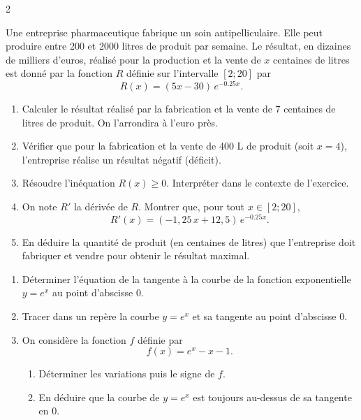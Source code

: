 \documentclass[a4paper,12pt]{article}
\begin{document}
\begin{multicols}{2}
    \newpage
    \begin{exercice}[title=Exercice 12 $\star\star$ { [Modéliser, Calculer] }]{}{}
      Une entreprise pharmaceutique fabrique un soin antipelliculaire. Elle peut produire entre 200 et 2000 litres de produit par semaine. Le résultat, en dizaines de milliers d’euros, réalisé pour la production et la vente de \(x\) centaines de litres est donné par la fonction \(R\) définie sur l’intervalle \([2;20]\) par  
      \[
      R(x)=(5x-30)\,e^{-0.25x}.
      \]
      \begin{enumerate}
        \item Calculer le résultat réalisé par la fabrication et la vente de 7 centaines de litres de produit. On l’arrondira à l’euro près.
        \item Vérifier que pour la fabrication et la vente de 400 L de produit (soit \(x=4\)), l’entreprise réalise un résultat négatif (déficit).
        \item Résoudre l’inéquation \(R(x)\ge0\). Interpréter dans le contexte de l’exercice.
        \item On note \(R'\) la dérivée de \(R\). Montrer que, pour tout \(x\in[2;20]\),
        \[
          R'(x)=(-1,25\,x+12,5)\,e^{-0.25x}.
        \]
        \item En déduire la quantité de produit (en centaines de litres) que l’entreprise doit fabriquer et vendre pour obtenir le résultat maximal.
      \end{enumerate}
      \end{exercice}
      
      \newcolumn
      
      \begin{exercice}[title=Exercice 13 $\star\star$ { [Raisonner, Représenter, Calculer] }]{}{}
      \begin{enumerate}
        \item[(a)] Déterminer l’équation de la tangente à la courbe de la fonction exponentielle \(y=e^x\) au point d’abscisse \(0\).
        \item[(b)] Tracer dans un repère la courbe \(y=e^x\) et sa tangente au point d’abscisse \(0\).
        \item On considère la fonction \(f\) définie par
        \[
          f(x)=e^x - x - 1.
        \]
        \begin{enumerate}
          \item Déterminer les variations puis le signe de \(f\).
          \item En déduire que la courbe de \(y=e^x\) est toujours au-dessus de sa tangente en \(0\).
        \end{enumerate}
      \end{enumerate}
      \end{exercice}
      

\end{multicols}
\end{document}
